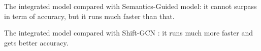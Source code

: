 \documentclass{article}
\begin{document}
The integrated model compared with Semantics-Guided \cite{Zhang_2020_CVPR} model: it cannot surpass in term of accuracy, but it runs much faster than that.

The integrated model compared with Shift-GCN \cite{Cheng_2020_CVPR}: it runs much more faster and gets better accuracy.










\end{document}
